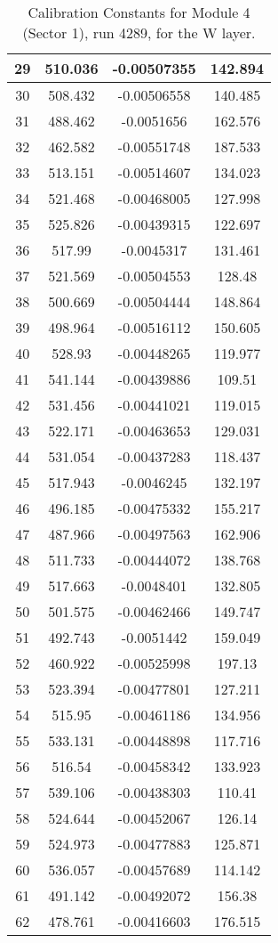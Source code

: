 \begin{table}[h]
{\begin{tabular}{|c|c|c|c|}
29	&	510.036	&	-0.00507355	&	142.894	\\	\hline
30	&	508.432	&	-0.00506558	&	140.485	\\	\hline
31	&	488.462	&	-0.0051656	&	162.576	\\	\hline
32	&	462.582	&	-0.00551748	&	187.533	\\	\hline
33	&	513.151	&	-0.00514607	&	134.023	\\	\hline
34	&	521.468	&	-0.00468005	&	127.998	\\	\hline
35	&	525.826	&	-0.00439315	&	122.697	\\	\hline
36	&	517.99	&	-0.0045317	&	131.461	\\	\hline
37	&	521.569	&	-0.00504553	&	128.48	\\	\hline
38	&	500.669	&	-0.00504444	&	148.864	\\	\hline
39	&	498.964	&	-0.00516112	&	150.605	\\	\hline
40	&	528.93	&	-0.00448265	&	119.977	\\	\hline
41	&	541.144	&	-0.00439886	&	109.51	\\	\hline
42	&	531.456	&	-0.00441021	&	119.015	\\	\hline
43	&	522.171	&	-0.00463653	&	129.031	\\	\hline
44	&	531.054	&	-0.00437283	&	118.437	\\	\hline
45	&	517.943	&	-0.0046245	&	132.197	\\	\hline
46	&	496.185	&	-0.00475332	&	155.217	\\	\hline
47	&	487.966	&	-0.00497563	&	162.906	\\	\hline
48	&	511.733	&	-0.00444072	&	138.768	\\	\hline
49	&	517.663	&	-0.0048401	&	132.805	\\	\hline
50	&	501.575	&	-0.00462466	&	149.747	\\	\hline
51	&	492.743	&	-0.0051442	&	159.049	\\	\hline
52	&	460.922	&	-0.00525998	&	197.13	\\	\hline
53	&	523.394	&	-0.00477801	&	127.211	\\	\hline
54	&	515.95	&	-0.00461186	&	134.956	\\	\hline
55	&	533.131	&	-0.00448898	&	117.716	\\	\hline
56	&	516.54	&	-0.00458342	&	133.923	\\	\hline
57	&	539.106	&	-0.00438303	&	110.41	\\	\hline
58	&	524.644	&	-0.00452067	&	126.14	\\	\hline
59	&	524.973	&	-0.00477883	&	125.871	\\	\hline
60	&	536.057	&	-0.00457689	&	114.142	\\	\hline
61	&	491.142	&	-0.00492072	&	156.38	\\	\hline
62	&	478.761	&	-0.00416603	&	176.515	\\	\hline
              \end{tabular}
        }
        \caption{Calibration Constants for Module 4 (Sector 1), run 4289, for the W layer.}
\end{table}

